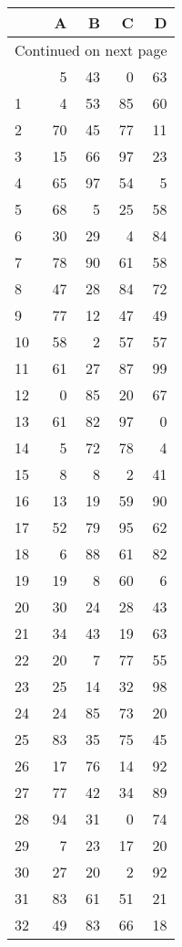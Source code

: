 \begin{longtable}{lrrrr}
\toprule
{} &   A &   B &   C &   D \\
\midrule
\endhead
\midrule
\multicolumn{5}{r}{{Continued on next page}} \\
\midrule
\endfoot

\bottomrule
\endlastfoot
0  &   5 &  43 &   0 &  63 \\
1  &   4 &  53 &  85 &  60 \\
2  &  70 &  45 &  77 &  11 \\
3  &  15 &  66 &  97 &  23 \\
4  &  65 &  97 &  54 &   5 \\
5  &  68 &   5 &  25 &  58 \\
6  &  30 &  29 &   4 &  84 \\
7  &  78 &  90 &  61 &  58 \\
8  &  47 &  28 &  84 &  72 \\
9  &  77 &  12 &  47 &  49 \\
10 &  58 &   2 &  57 &  57 \\
11 &  61 &  27 &  87 &  99 \\
12 &   0 &  85 &  20 &  67 \\
13 &  61 &  82 &  97 &   0 \\
14 &   5 &  72 &  78 &   4 \\
15 &   8 &   8 &   2 &  41 \\
16 &  13 &  19 &  59 &  90 \\
17 &  52 &  79 &  95 &  62 \\
18 &   6 &  88 &  61 &  82 \\
19 &  19 &   8 &  60 &   6 \\
20 &  30 &  24 &  28 &  43 \\
21 &  34 &  43 &  19 &  63 \\
22 &  20 &   7 &  77 &  55 \\
23 &  25 &  14 &  32 &  98 \\
24 &  24 &  85 &  73 &  20 \\
25 &  83 &  35 &  75 &  45 \\
26 &  17 &  76 &  14 &  92 \\
27 &  77 &  42 &  34 &  89 \\
28 &  94 &  31 &   0 &  74 \\
29 &   7 &  23 &  17 &  20 \\
30 &  27 &  20 &   2 &  92 \\
31 &  83 &  61 &  51 &  21 \\
32 &  49 &  83 &  66 &  18 \\

\end{longtable}
